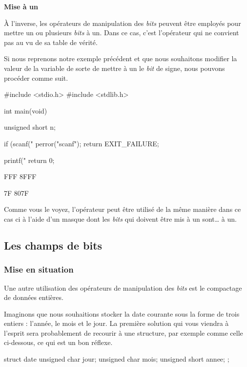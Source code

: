 \begin{infobox}
\textbf{Mise à un}
\label{mise-a-un}

À l'inverse, les opérateurs de manipulation des \emph{bits} peuvent être
employés pour mettre un ou plusieurs \emph{bits} à un. Dans ce cas,
c'est l'opérateur \mybox{\&} qui ne convient pas au vu de sa table de
vérité.

Si nous reprenons notre exemple précédent et que nous souhaitons
modifier la valeur de la variable  de sorte de mettre à un le
\emph{bit} de signe, nous pouvons procéder comme suit.

\begin{C}
#include <stdio.h>
#include <stdlib.h>


int main(void)
{
    unsigned short n;

    if (scanf("%
    {
        perror("scanf");
        return EXIT_FAILURE;
    }

    printf("%
    return 0;
}
\end{C}

\begin{C}
FFF
8FFF

7F
807F
\end{C}

Comme vous le voyez, l'opérateur \mybox{\textbar{}} peut être utilisé
de la même manière dans ce cas ci à l'aide d'un masque dont les
\emph{bits} qui doivent être mis à un sont\ldots{} à un.

\subsection{Les champs de bits}
\label{les-champs-de-bits}

\subsubsection{Mise en situation}
\label{mise-en-situation}

Une autre utilisation des opérateurs de manipulation des \emph{bits} est
le compactage de données entières.

Imaginons que nous souhaitions stocker la date courante sous la forme de
trois entiers : l'année, le mois et le jour. La première solution qui
vous viendra à l'esprit sera probablement de recourir à une structure,
par exemple comme celle ci-dessous, ce qui est un bon réflexe.

\begin{C}
struct date {
    unsigned char jour;
    unsigned char mois;
    unsigned short annee;
};
\end{C}


\end{infobox}
